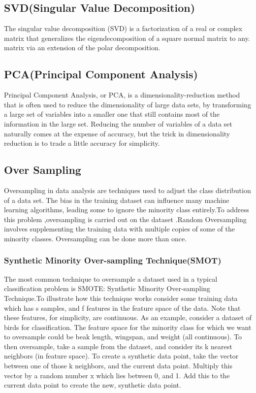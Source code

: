 \subsection{SVD(Singular Value Decomposition)}
The singular value decomposition (SVD) is a factorization of a real or complex matrix that generalizes the eigendecomposition of a square normal matrix to any. matrix via an extension of the polar decomposition.

\subsection{PCA(Principal Component Analysis)}
Principal Component Analysis, or PCA, is a dimensionality-reduction method that is often used to reduce the dimensionality of large data sets, by transforming a large set of variables into a smaller one that still contains most of the information in the large set.
Reducing the number of variables of a data set naturally comes at the expense of accuracy, but the trick in dimensionality reduction is to trade a little accuracy for simplicity. 


\subsection{Over Sampling}
Oversampling  in data analysis are techniques used to adjust the class distribution of a data set.
The bias in the training dataset can influence many machine learning algorithms, leading some to ignore the minority class entirely.To address this problem ,oversampling is carried out on the dataset .Random Oversampling involves supplementing the training data with multiple copies of some of the minority classes. Oversampling can be done more than once.
\subsubsection{Synthetic Minority Over-sampling Technique(SMOT)}
The most common technique to oversample a dataset used in a typical classification problem is SMOTE: Synthetic Minority Over-sampling Technique.To illustrate how this technique works consider some training data which has s samples, and f features in the feature space of the data. Note that these features, for simplicity, are continuous. As an example, consider a dataset of birds for classification. The feature space for the minority class for which we want to oversample could be beak length, wingspan, and weight (all continuous). To then oversample, take a sample from the dataset, and consider its k nearest neighbors (in feature space). To create a synthetic data point, take the vector between one of those k neighbors, and the current data point. Multiply this vector by a random number x which lies between 0, and 1. Add this to the current data point to create the new, synthetic data point.\cite{smot}

